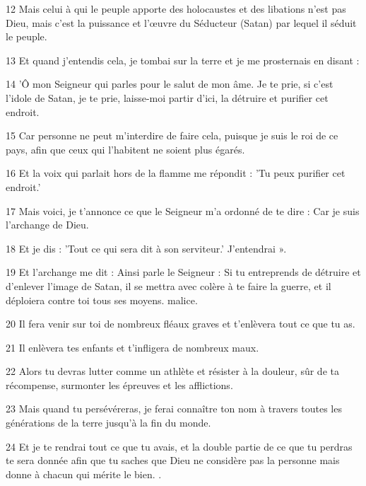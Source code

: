 \par 12 Mais celui à qui le peuple apporte des holocaustes et des libations n'est pas Dieu, mais c'est la puissance et l'œuvre du Séducteur (Satan) par lequel il séduit le peuple.

\par 13 Et quand j'entendis cela, je tombai sur la terre et je me prosternais en disant :

\par 14 'Ô mon Seigneur qui parles pour le salut de mon âme. Je te prie, si c'est l'idole de Satan, je te prie, laisse-moi partir d'ici, la détruire et purifier cet endroit.

\par 15 Car personne ne peut m'interdire de faire cela, puisque je suis le roi de ce pays, afin que ceux qui l'habitent ne soient plus égarés.

\par 16 Et la voix qui parlait hors de la flamme me répondit : 'Tu peux purifier cet endroit.'

\par 17 Mais voici, je t'annonce ce que le Seigneur m'a ordonné de te dire : Car je suis l'archange de Dieu.

\par 18 Et je dis : 'Tout ce qui sera dit à son serviteur.' J'entendrai ».

\par 19 Et l'archange me dit : Ainsi parle le Seigneur : Si tu entreprends de détruire et d'enlever l'image de Satan, il se mettra avec colère à te faire la guerre, et il déploiera contre toi tous ses moyens. malice.

\par 20 Il fera venir sur toi de nombreux fléaux graves et t'enlèvera tout ce que tu as.

\par 21 Il enlèvera tes enfants et t'infligera de nombreux maux.

\par 22 Alors tu devras lutter comme un athlète et résister à la douleur, sûr de ta récompense, surmonter les épreuves et les afflictions.

\par 23 Mais quand tu persévéreras, je ferai connaître ton nom à travers toutes les générations de la terre jusqu'à la fin du monde.

\par 24 Et je te rendrai tout ce que tu avais, et la double partie de ce que tu perdras te sera donnée afin que tu saches que Dieu ne considère pas la personne mais donne à chacun qui mérite le bien. .

